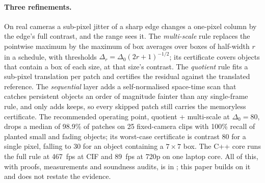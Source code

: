 \paragraph{Three refinements.} On real cameras a sub-pixel jitter of a sharp edge changes a one-pixel column by the edge's full contrast, and the range sees it. The \emph{multi-scale} rule replaces the pointwise maximum by the maximum of box averages over boxes of half-width $r$ in a schedule, with thresholds $\Delta_r = \Delta_0 (2r+1)^{-1/2}$; its certificate covers objects that contain a box of each size, at that size's contrast. The \emph{quotient} rule fits a sub-pixel translation per patch and certifies the residual against the translated reference. The \emph{sequential} layer adds a self-normalised space-time scan that catches persistent objects an order of magnitude fainter than any single-frame rule, and only adds keeps, so every skipped patch still carries the memoryless certificate. The recommended operating point, quotient + multi-scale at $\Delta_0 = 80$, drops a median of 98.9\% of patches on 25 fixed-camera clips with 100\% recall of planted small and fading objects; its worst-case certificate is contrast 80 for a single pixel, falling to 30 for an object containing a $7 \times 7$ box. The C++ core runs the full rule at 467~fps at CIF and 89~fps at 720p on one laptop core. All of this, with proofs, measurements and soundness audits, is in \citet{nair2026certifiedskip}; this paper builds on it and does not restate the evidence.
